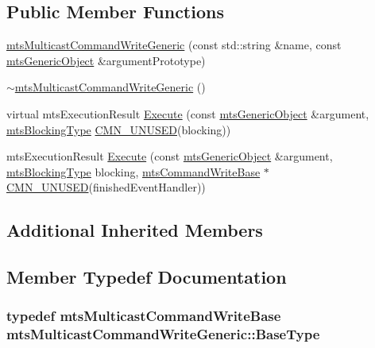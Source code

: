 \subsection*{Public Member Functions}
\begin{DoxyCompactItemize}
\item 
\hyperlink{classmts_multicast_command_write_generic_a0dfaa78a4f3b696f30c16a9c91621a56}{mts\+Multicast\+Command\+Write\+Generic} (const std\+::string \&name, const \hyperlink{classmts_generic_object}{mts\+Generic\+Object} \&argument\+Prototype)
\item 
\hyperlink{classmts_multicast_command_write_generic_a57c99817ece859e07be08243dff7f70e}{$\sim$mts\+Multicast\+Command\+Write\+Generic} ()
\item 
virtual mts\+Execution\+Result \hyperlink{classmts_multicast_command_write_generic_adef62d44a0e2fc7c05d92d67356b25ab}{Execute} (const \hyperlink{classmts_generic_object}{mts\+Generic\+Object} \&argument, \hyperlink{mts_forward_declarations_8h_ad7426ccb6c883bc780d0ee197dddcbe7}{mts\+Blocking\+Type} \hyperlink{cmn_portability_8h_a021894e2626935fa2305434b1e893ff6}{C\+M\+N\+\_\+\+U\+N\+U\+S\+E\+D}(blocking))
\item 
mts\+Execution\+Result \hyperlink{classmts_multicast_command_write_generic_ac0d9b6b578959511ddc197c38b3d05e4}{Execute} (const \hyperlink{classmts_generic_object}{mts\+Generic\+Object} \&argument, \hyperlink{mts_forward_declarations_8h_ad7426ccb6c883bc780d0ee197dddcbe7}{mts\+Blocking\+Type} blocking, \hyperlink{classmts_command_write_base}{mts\+Command\+Write\+Base} $\ast$\hyperlink{cmn_portability_8h_a021894e2626935fa2305434b1e893ff6}{C\+M\+N\+\_\+\+U\+N\+U\+S\+E\+D}(finished\+Event\+Handler))
\end{DoxyCompactItemize}
\subsection*{Additional Inherited Members}


\subsection{Member Typedef Documentation}
\hypertarget{classmts_multicast_command_write_generic_ad9b380aee1bd7519d91697092a045bf9}{}
\subsubsection[{Base\+Type}]{\setlength{\rightskip}{0pt plus 5cm}typedef {\bf mts\+Multicast\+Command\+Write\+Base} {\bf mts\+Multicast\+Command\+Write\+Generic\+::\+Base\+Type}}\label{classmts_multicast_command_write_generic_ad9b380aee1bd7519d91697092a045bf9}


